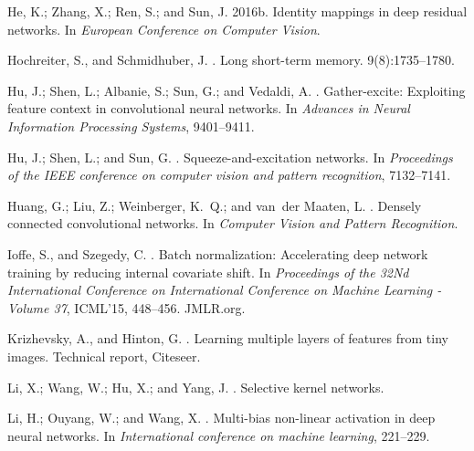 \documentclass[letterpaper]{article} \usepackage{aaai20}  \usepackage{times}  \usepackage{helvet} \usepackage{courier}  \usepackage[hyphens]{url}  \usepackage{graphicx} \urlstyle{rm} \def\UrlFont{\rm}  \usepackage{graphicx}  \frenchspacing  \setlength{\pdfpagewidth}{8.5in}  \setlength{\pdfpageheight}{11in}  \usepackage{color}
\begin{document}
\begin{thebibliography}{}
	He, K.; Zhang, X.; Ren, S.; and Sun, J.
	\newblock 2016b.
	\newblock Identity mappings in deep residual networks.
	\newblock In {\em European Conference on Computer Vision}.
	
	Hochreiter, S., and Schmidhuber, J.
	.
	\newblock Long short-term memory.
	 9(8):1735--1780.
	
	Hu, J.; Shen, L.; Albanie, S.; Sun, G.; and Vedaldi, A.
	.
	\newblock Gather-excite: Exploiting feature context in convolutional neural
	networks.
	\newblock In {\em Advances in Neural Information Processing Systems},
	9401--9411.
	
	Hu, J.; Shen, L.; and Sun, G.
	.
	\newblock Squeeze-and-excitation networks.
	\newblock In {\em Proceedings of the IEEE conference on computer vision and
		pattern recognition},  7132--7141.
	
	Huang, G.; Liu, Z.; Weinberger, K.~Q.; and van~der Maaten, L.
	.
	\newblock Densely connected convolutional networks.
	\newblock In {\em Computer Vision and Pattern Recognition}.
	
	Ioffe, S., and Szegedy, C.
	.
	\newblock Batch normalization: Accelerating deep network training by reducing
	internal covariate shift.
	\newblock In {\em Proceedings of the 32Nd International Conference on
		International Conference on Machine Learning - Volume 37}, ICML'15,
	448--456.
	\newblock JMLR.org.
	
	Krizhevsky, A., and Hinton, G.
	.
	\newblock Learning multiple layers of features from tiny images.
	\newblock Technical report, Citeseer.
	
	Li, X.; Wang, W.; Hu, X.; and Yang, J.
	.
	\newblock Selective kernel networks.
	
	Li, H.; Ouyang, W.; and Wang, X.
	.
	\newblock Multi-bias non-linear activation in deep neural networks.
	\newblock In {\em International conference on machine learning},  221--229.
	

\end{thebibliography}
\end{document}
